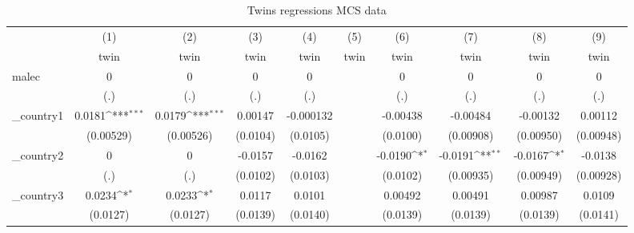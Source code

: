 \begin{table}[htbp]\centering
\def\sym#1{\ifmmode^{#1}\else\(^{#1}\)\fi}
\caption{Twins regressions MCS data}
\begin{tabular}{l*{9}{c}}
\hline\hline
            &\multicolumn{1}{c}{(1)}&\multicolumn{1}{c}{(2)}&\multicolumn{1}{c}{(3)}&\multicolumn{1}{c}{(4)}&\multicolumn{1}{c}{(5)}&\multicolumn{1}{c}{(6)}&\multicolumn{1}{c}{(7)}&\multicolumn{1}{c}{(8)}&\multicolumn{1}{c}{(9)}\\
            &\multicolumn{1}{c}{twin}&\multicolumn{1}{c}{twin}&\multicolumn{1}{c}{twin}&\multicolumn{1}{c}{twin}&\multicolumn{1}{c}{twin}&\multicolumn{1}{c}{twin}&\multicolumn{1}{c}{twin}&\multicolumn{1}{c}{twin}&\multicolumn{1}{c}{twin}\\
\hline
malec       &           0         &           0         &           0         &           0         &                     &           0         &           0         &           0         &           0         \\
            &         (.)         &         (.)         &         (.)         &         (.)         &                     &         (.)         &         (.)         &         (.)         &         (.)         \\
[1em]
\_country1   &      0.0181\sym{***}&      0.0179\sym{***}&     0.00147         &   -0.000132         &                     &    -0.00438         &    -0.00484         &    -0.00132         &     0.00112         \\
            &   (0.00529)         &   (0.00526)         &    (0.0104)         &    (0.0105)         &                     &    (0.0100)         &   (0.00908)         &   (0.00950)         &   (0.00948)         \\
[1em]
\_country2   &           0         &           0         &     -0.0157         &     -0.0162         &                     &     -0.0190\sym{*}  &     -0.0191\sym{**} &     -0.0167\sym{*}  &     -0.0138         \\
            &         (.)         &         (.)         &    (0.0102)         &    (0.0103)         &                     &    (0.0102)         &   (0.00935)         &   (0.00949)         &   (0.00928)         \\
[1em]
\_country3   &      0.0234\sym{*}  &      0.0233\sym{*}  &      0.0117         &      0.0101         &                     &     0.00492         &     0.00491         &     0.00987         &      0.0109         \\
            &    (0.0127)         &    (0.0127)         &    (0.0139)         &    (0.0140)         &                     &    (0.0139)         &    (0.0139)         &    (0.0139)         &    (0.0141)         \\

\end{tabular}
\end{table}
